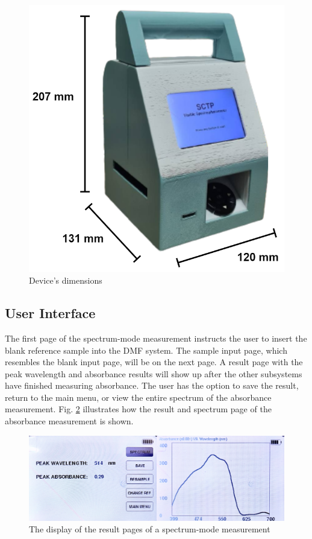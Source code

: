 \documentclass[conference]{IEEEtran}
\begin{document}
\begin{figure}[htbp]
    \centerline{\includegraphics[scale=0.25]{SCTP_size.png}}
    \caption{Device's dimensions}
    \label{device_dimensions}
    \end{figure}

\subsection{User Interface}
The first page of the spectrum-mode measurement instructs the user to insert the blank reference sample into the DMF system.
The sample input page, which resembles the blank input page, will be on the next page.
A result page with the peak wavelength and absorbance results will show up after the other subsystems have finished measuring absorbance.
The user has the option to save the result, return to the main menu, or view the entire spectrum of the absorbance measurement.
Fig. \ref{lcd-spec} illustrates how the result and spectrum page of the absorbance measurement is shown.

    \begin{figure}[htbp]
    \centerline{\includegraphics[scale=0.06]{lcd-spec.JPEG}}
    \caption{The display of the result pages of a spectrum-mode measurement}
    \label{lcd-spec}
    \end{figure}
\end{document}
